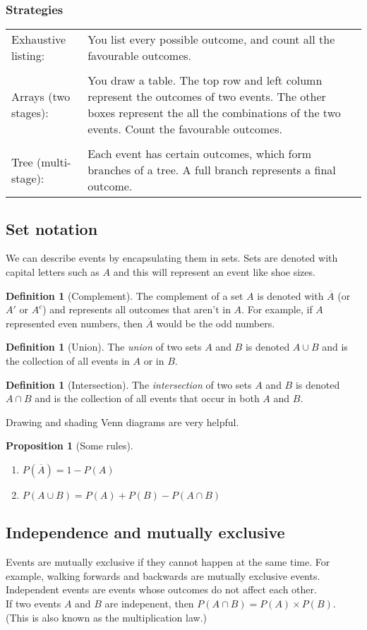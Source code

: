 \documentclass[12pt]{book}
\newtheorem{prop}[theo]{Proposition}
\theoremstyle{definition}
\newtheorem{defi}[theo]{Definition}
\begin{document}
\subsubsection*{Strategies}
  \begin{tabularx}{\linewidth}{l X}
  Exhaustive listing: & You list every possible outcome, and count all the favourable outcomes. \\ \\
  Arrays (two stages): & You draw a table. The top row and left column represent the outcomes of two events. The other boxes
    represent the all the combinations of the two events. Count the favourable outcomes. \\ \\ 
  Tree (multi-stage): & Each event has certain outcomes, which form branches of a tree. A full branch represents a final outcome.  
  \end{tabularx}
\subsection{Set notation}
  We can describe events by encapsulating them in sets. Sets are denoted with capital letters such as $A$ and this will represent
  an event like shoe sizes.
  \begin{defi}[Complement]
    The complement of a set $A$ is denoted with $\overline{A}$ (or $A'$ or $A^c$) and represents all outcomes that aren't in $A$.
    For example, if $A$ represented even numbers, then $\overline{A}$ would be the odd numbers.
  \end{defi}
  \begin{defi}[Union]
    The \textit{union} of two sets $A$ and $B$ is denoted $A\cup B$ and is the collection of all events in $A$ or in $B$.
  \end{defi}
  \begin{defi}[Intersection]
    The \textit{intersection} of two sets $A$ and $B$ is denoted $A\cap B$ and is the collection of all events that occur
    in both $A$ and $B$.
  \end{defi}
  Drawing and shading Venn diagrams are very helpful.
  \begin{prop}[Some rules]
    \ \begin{enumerate}
      \item $P(\overline{A})=1-P(A)$
      \item $P(A\cup B)=P(A)+P(B)-P(A\cap B)$
    \end{enumerate}
  \end{prop}
\subsection{Independence and mutually exclusive}
  Events are mutually exclusive if they cannot happen at the same time. For example, walking forwards and backwards are mutually
  exclusive events. Independent events are events whose outcomes do not affect each other.
  \vspace{1em} \\
  If two events $A$ and $B$ are indepenent, then $P(A\cap B)=P(A)\times P(B)$. (This is also known as the multiplication law.)
\end{document}
